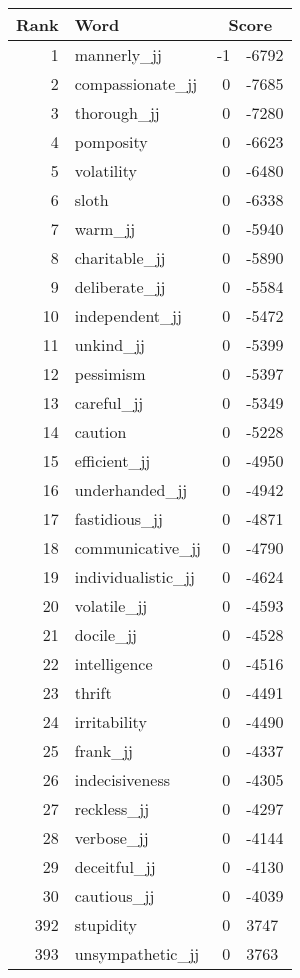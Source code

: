 \begin{longtable}[!htbp]{| rlr@{.}l |}
    \hline
    \textbf{Rank} & \textbf{Word} & \multicolumn{2}{c|}{\textbf{Score}} \\
    \hline
    \endhead
    1 & mannerly\_jj & -1 & -6792 \\
    2 & compassionate\_jj & 0 & -7685 \\
    3 & thorough\_jj & 0 & -7280 \\
    4 & pomposity & 0 & -6623 \\
    5 & volatility & 0 & -6480 \\
    6 & sloth & 0 & -6338 \\
    7 & warm\_jj & 0 & -5940 \\
    8 & charitable\_jj & 0 & -5890 \\
    9 & deliberate\_jj & 0 & -5584 \\
    10 & independent\_jj & 0 & -5472 \\
    11 & unkind\_jj & 0 & -5399 \\
    12 & pessimism & 0 & -5397 \\
    13 & careful\_jj & 0 & -5349 \\
    14 & caution & 0 & -5228 \\
    15 & efficient\_jj & 0 & -4950 \\
    16 & underhanded\_jj & 0 & -4942 \\
    17 & fastidious\_jj & 0 & -4871 \\
    18 & communicative\_jj & 0 & -4790 \\
    19 & individualistic\_jj & 0 & -4624 \\
    20 & volatile\_jj & 0 & -4593 \\
    21 & docile\_jj & 0 & -4528 \\
    22 & intelligence & 0 & -4516 \\
    23 & thrift & 0 & -4491 \\
    24 & irritability & 0 & -4490 \\
    25 & frank\_jj & 0 & -4337 \\
    26 & indecisiveness & 0 & -4305 \\
    27 & reckless\_jj & 0 & -4297 \\
    28 & verbose\_jj & 0 & -4144 \\
    29 & deceitful\_jj & 0 & -4130 \\
    30 & cautious\_jj & 0 & -4039 \\
    392 & stupidity & 0 & 3747 \\
    393 & unsympathetic\_jj & 0 & 3763 \\

\end{longtable}
